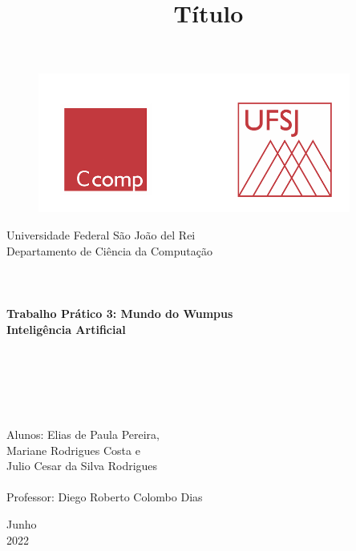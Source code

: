 \documentclass[a4paper, 12pt]{article}
\begin{document}
\begin{titlepage}
	\begin{center}
	
	\begin{figure}[ht]
    \centering
    \includegraphics[width=.44\textwidth]{LogoUFSJ.PNG}
    \label{fig:Capturar.PNG}
    \end{figure}

    	\Huge{Universidade Federal São João del Rei}\\
		\Large{Departamento de Ciência da Computação}\\ 

        \vspace{110pt}
        \textbf{\LARGE{
        \\
        \\
        \\
        Trabalho Prático 3: Mundo do Wumpus\\
        \vspace{0.5cm}
        \Large{Inteligência Artificial}
        \\
        \\
        \\
        }}
        
		\title{{\large{Título}}}
		\vspace{1cm}
	\end{center}
	    
    \begin{flushleft}
		\begin{tabbing}
		\\
		\\
		\\	
		\large{Alunos: Elias de Paula Pereira,}\\ 
		\large{\hspace{1.9cm}Mariane Rodrigues Costa e}\\
		\large{\hspace{1.9cm}Julio Cesar da Silva Rodrigues}
		\\
	    \\
		\large{Professor: Diego Roberto Colombo Dias}\\
	    \end{tabbing}
    \end{flushleft}
	\vspace{0.85cm}
	
	\begin{center}
		\vspace{\fill}
			Junho\\
		    2022
	\end{center}
\end{titlepage}
\end{document}
